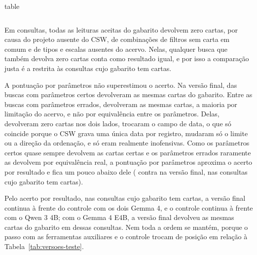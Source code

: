\begin{fixo}{table}
\begin{tabular}{|>{\raggedright\arraybackslash}p{5.6cm}|>{\centering\arraybackslash}p{2.8cm}|>{\centering\arraybackslash}p{2.8cm}|>{\centering\arraybackslash}p{2.8cm}|}
\end{tabular}
\end{fixo}

Em  consultas, todas as leituras aceitas do gabarito devolvem zero cartas, por causa do projeto ausente do CSW, de combinações de filtros sem carta em comum e de tipos e escalas ausentes do acervo. Nelas, qualquer busca que também devolva zero cartas conta como resultado igual, e por isso a comparação justa é a restrita às  consultas cujo gabarito tem cartas.

A pontuação por parâmetros não superestimou o acerto. Na versão final,  das  buscas com parâmetros certos devolveram as mesmas cartas do gabarito. Entre as buscas com parâmetros errados,  devolveram as mesmas cartas, a maioria por limitação do acervo, e não por equivalência entre os parâmetros. Delas,  devolveram zero cartas nos dois lados,  trocaram o campo de data, o que só coincide porque o CSW grava uma única data por registro,  mudaram só o limite ou a direção da ordenação, e só  eram realmente inofensivas. Como os parâmetros certos quase sempre devolvem as cartas certas e os parâmetros errados raramente as devolvem por equivalência real, a pontuação por parâmetros aproxima o acerto por resultado e fica um pouco abaixo dele ( contra  na versão final, nas consultas cujo gabarito tem cartas).

Pelo acerto por resultado, nas consultas cujo gabarito tem cartas, a versão final continua à frente do controle com os dois Gemma 4, e o controle continua à frente com o Qwen 3 4B; com o Gemma 4 E4B, a versão final devolveu as mesmas cartas do gabarito em  dessas consultas. Nem toda a ordem se mantém, porque o passo com as ferramentas auxiliares e o controle trocam de posição em relação à Tabela~\ref{tab:versoes-teste}.

